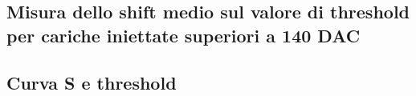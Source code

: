 \subsection{Misura dello shift medio sul valore di threshold per cariche iniettate superiori a 140 DAC}

\begin{comment}
Per poter valutare dunque questo shift artificiale sul valore della threshold, per ogni flavor della matrice abbiamo effettuato due misure della threshold e sua dispersione separate:

\begin{itemize}
\item per carica iniettata pari a 140 DAC $\rightarrow$ prima della regione di saturazione;
\item per carica iniettata pari a 200 DAC $\rightarrow$ limite massimo della ragione di saturazione (da questo valore in poi, aumenta solo la threshold, non la carica effettivamente iniettata).
\end{itemize}

Per ognuna di queste misure, è stata fittata la distribuzione della threshold per poter ottenere un valore medio sull'intero flavor, e chiamando $\Q_{th, 140}$ e $\Q_{th, 200}$  rispettivamente i valori di threshold ottenuti per iniezione a 140 e 200 DAC, è stato stimato lo shift medio come:

\begin{equation}
\Delta Q = Q_{th,200} - Q_{th,140}
\end{equation}

Infine, ai dati ottenuti per impulsi di iniezioni di 200 DAC, è stato sottratto questo valore di carica, per poter estrapolare fino a un valore di 170 DAC effettivo, il comportamento dei pixel iniettati.

Si riporta nelle sezioni successive quanto ottenuto per ciascun flavor della matrice, con il metodo utilizzato per poter stimare la threshold.

\end{comment}

\subsection{Curva S e threshold}

